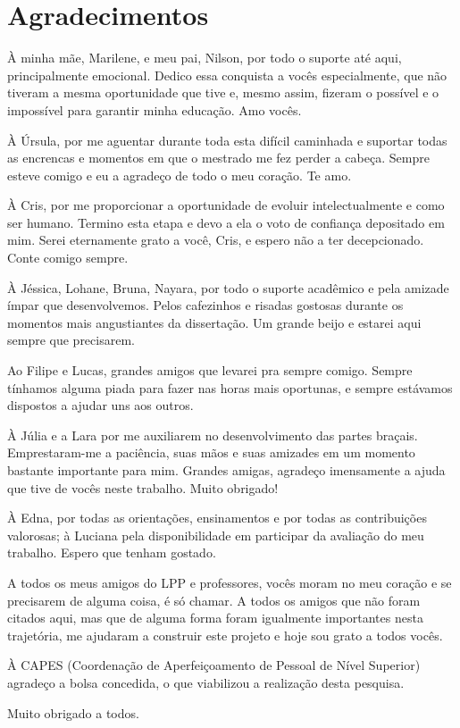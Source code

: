 \section*{Agradecimentos}
\vspace*{1.5cm}
\thispagestyle{empty}
\begin{onehalfspace}
À minha mãe, Marilene, e meu pai, Nilson, por todo o suporte até aqui, principalmente emocional. Dedico essa conquista a vocês especialmente, que não tiveram a mesma oportunidade que tive e, mesmo assim, fizeram o possível e o impossível para garantir minha educação. Amo vocês.\par
À Úrsula, por me aguentar durante toda esta difícil caminhada e suportar todas as encrencas e momentos em que o mestrado me fez perder a cabeça. Sempre esteve comigo e eu a agradeço de todo o meu coração. Te amo.\par
À Cris, por me proporcionar a oportunidade de evoluir intelectualmente e como ser humano. Termino esta etapa e devo a ela o voto de confiança depositado em mim. Serei eternamente grato a você, Cris, e espero não a ter decepcionado. Conte comigo sempre.\par
À Jéssica, Lohane, Bruna, Nayara, por todo o suporte acadêmico e pela amizade ímpar que desenvolvemos. Pelos cafezinhos e risadas gostosas durante os momentos mais angustiantes da dissertação. Um grande beijo e estarei aqui sempre que precisarem.\par
Ao Filipe e Lucas, grandes amigos que levarei pra sempre comigo. Sempre tínhamos alguma piada para fazer nas horas mais oportunas, e sempre estávamos dispostos a ajudar uns aos outros.\par
À Júlia e a Lara por me auxiliarem no desenvolvimento das partes braçais. Emprestaram-me a paciência, suas mãos e suas amizades em um momento bastante importante para mim. Grandes amigas, agradeço imensamente a ajuda que tive de vocês neste trabalho. Muito obrigado!\par
À Edna, por todas as orientações, ensinamentos e por todas as contribuições valorosas; à Luciana pela disponibilidade em participar da avaliação do meu trabalho. Espero que tenham gostado.\par
A todos os meus amigos do LPP e professores, vocês moram no meu coração e se precisarem de alguma coisa, é só chamar. A todos os amigos que não foram citados aqui, mas que de alguma forma foram igualmente importantes nesta trajetória, me ajudaram a construir este projeto e hoje sou grato a todos vocês.\par
À CAPES (Coordenação de Aperfeiçoamento de Pessoal de Nível Superior) agradeço a bolsa concedida, o que viabilizou a realização desta pesquisa.\par
Muito obrigado a todos.\par
\end{onehalfspace}
